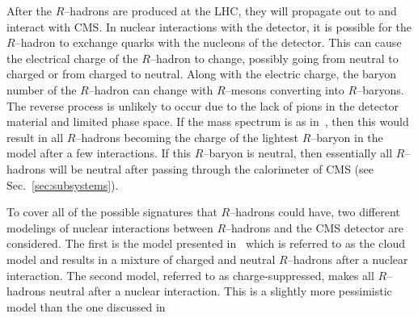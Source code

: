 
After the $R$--hadrons are produced at the LHC, they will propagate out to and interact with CMS.
In nuclear interactions with the detector, it is possible for the 
$R$--hadron to exchange quarks with the nucleons of the detector.
This can cause the
electrical charge of the $R$--hadron to change, possibly going from neutral
to charged or from charged to neutral. 
Along with the electric charge, the baryon number of the $R$--hadron can change with $R$--mesons converting into $R$--baryons.
The reverse process is unlikely to occur due to the lack of pions in the detector material and limited phase space.
If the mass spectrum is as in~\cite{Mackeprang:2009ad}, then this would result in all $R$--hadrons becoming the charge of the lightest $R$--baryon in the model
after a few interactions. If this $R$--baryon is neutral, then essentially all $R$--hadrons will be neutral after passing through the calorimeter of CMS
(see Sec.~\ref{sec:subsystems}).

To cover all of the possible signatures that $R$--hadrons could have, two different modelings of nuclear interactions between $R$--hadrons and the CMS detector are considered.
The first is the model presented in~\cite{Kraan:2004tz, Mackeprang:2006gx} 
which is referred to as the cloud model and results in a mixture of charged and neutral $R$--hadrons after a nuclear interaction.
The second model, referred to as charge-suppressed, makes all $R$--hadrons neutral after a nuclear interaction.
This is a slightly more pessimistic model than the one discussed in~\cite{Mackeprang:2009ad}

